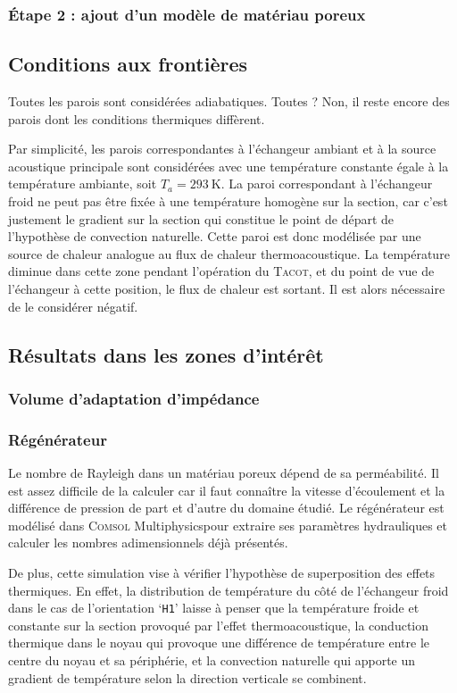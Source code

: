\subsubsection{\'Etape 2 : ajout d'un modèle de matériau poreux}


\subsection{Conditions aux frontières}
Toutes les parois sont considérées adiabatiques. Toutes ? Non, il reste encore des parois dont les conditions thermiques diffèrent. 

Par simplicité, les parois correspondantes à l'échangeur ambiant et à la source acoustique principale sont considérées avec une température constante égale à la température ambiante, soit $T_a=\qty{293}{\kelvin}$. La paroi correspondant à l'échangeur froid ne peut pas être fixée à une température homogène sur la section, car c'est justement le gradient sur la section qui constitue le point de départ de l'hypothèse de convection naturelle. Cette paroi est donc modélisée par une source de chaleur analogue au flux de chaleur thermoacoustique. La température diminue dans cette zone pendant l'opération du \textsc{Tacot}, et du point de vue de l'échangeur à cette position, le flux de chaleur est sortant. Il est alors nécessaire de le considérer négatif.

\subsection{Résultats dans les zones d'intérêt}
\subsubsection{Volume d'adaptation d'impédance}

\subsubsection{Régénérateur}
Le nombre de Rayleigh dans un matériau poreux dépend de sa perméabilité. Il est assez difficile de la calculer car il faut connaître la vitesse d'écoulement et la différence de pression de part et d'autre du domaine étudié. Le régénérateur est modélisé dans \textsc{Comsol} Multiphysics\textss\textregistered pour extraire ses paramètres hydrauliques et calculer les nombres adimensionnels déjà présentés.

De plus, cette simulation vise à vérifier l'hypothèse de superposition des effets thermiques. En effet, la distribution de température du côté de l'échangeur froid dans le cas de l'orientation `\texttt{H1}' laisse à penser que la température froide et constante sur la section provoqué par l'effet thermoacoustique, la conduction thermique dans le noyau qui provoque une différence de température entre le centre du noyau et sa périphérie, et la convection naturelle qui apporte un gradient de température selon la direction verticale se combinent.

